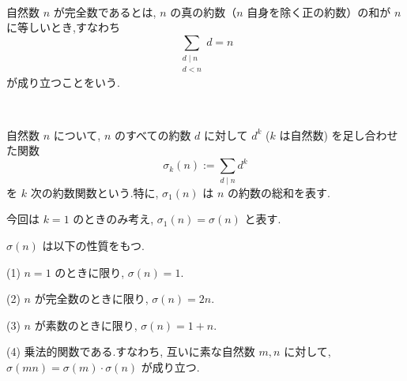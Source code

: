 %

\begin{definition}[完全数]\label{perfect}\leanok~\

自然数 \(n\) が完全数であるとは, \(n\) の真の約数（\(n\) 自身を除く正の約数）の和が \(n\) に等しいとき,すなわち
\[
\sum_{\substack{d \mid n\\ d < n}} d = n
\]
\;\;\;が成り立つことをいう.

\end{definition}


\begin{definition}[約数関数]\label{Arithmetic_Function}\leanok~\

自然数 \(n\) について, \(n\) のすべての約数 \(d\) に対して \(d^k\) (\(k\) は自然数) を足し合わせた関数
\[
\sigma_k(n) := \sum_{d \mid n} d^k
\]
\;\;\;を \(k\) 次の約数関数という.特に, \(\sigma_1(n)\) は \(n\) の約数の総和を表す.

\end{definition}

\vspace{0.5\baselineskip}

今回は \(k = 1\) のときのみ考え, \(\sigma_1(n) = \sigma(n)\) と表す.

\begin{lemma}

\(\sigma(n)\) は以下の性質をもつ.

\vspace{0.5\baselineskip}

(1) \(n = 1\) のときに限り, \(\sigma(n) = 1\).

(2) \(n\) が完全数のときに限り, \(\sigma(n) = 2n\).

(3) \(n\) が素数のときに限り, \(\sigma(n) =  1 + n\).

(4) 乗法的関数である.すなわち, 互いに素な自然数 \(m, n\) に対して, \(\sigma(mn) = \sigma(m) \cdot \sigma(n)\) が成り立つ.

\end{lemma}

